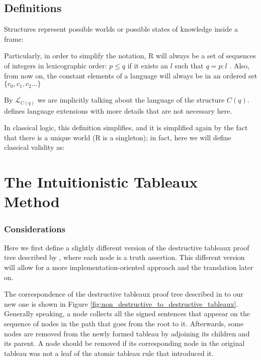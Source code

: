 \documentclass[runningheads]{llncs}
\begin{document}
\subsection{Definitions}

\structureDefinition
Structures represent possible worlds or possible states of knowledge inside a frame:
\kripkeFrameDefinition

Particularly, in order to simplify the notation, R will always be a set of sequences of integers in lexicographic order: $p \leq q$ if it exists an $l$ such that $q =  p:l$  . 
 Also, from now on, the constant elements of a language will always be in an ordered set $\{c_0, c_1, c_2 ...\}$
 
 \figureRandFrame

\forcingDefinition

By $\mathcal{L}_{C(q)}$ we are implicitly talking about the language of the structure $C(q)$. \cite{book1} defines language extensions with more details that are not necessary here.

\intuitionisticValidityDefinition

In classical logic, this definition simplifies, and it is simplified again by the fact that there is a unique world (R is a singleton); in fact, here we will define classical validity as: \cite{book1}

\classicalValidityDefinition

\section{The Intuitionistic Tableaux Method}

\subsubsection{Considerations}


    Here we first define a slightly different version of the destructive tableaux proof tree described by \cite{book1}, where each node is a truth assertion. This different version  will allow for a more implementation-oriented approach and the translation later on.

    The correspondence of the destructive tableaux proof tree described in \cite{book1} to our new one is shown in Figure \ref{fig:non_destructive_to_destructive_tableaux}.
     Generally speaking, a node collects all the signed sentences that appeear on the sequence of nodes in the path that goes from the root to it.
      Afterwards, some nodes are removed from the newly formed tableau by adjoining its children and its parent.
       A node should be removed if its corresponding node in the original tableau was not a leaf of the atomic tableau rule  \cite{book1} that introduced it.
\end{document}

